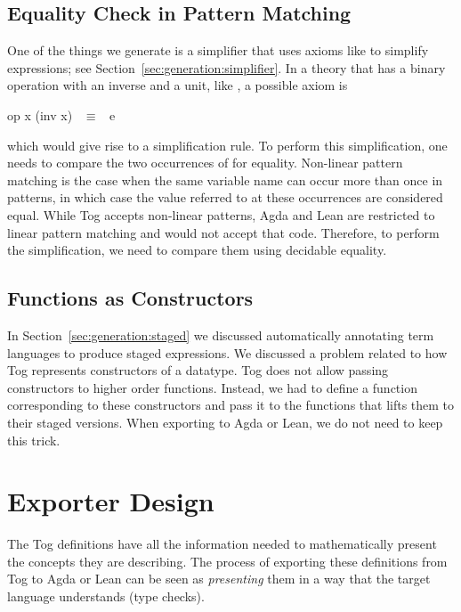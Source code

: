 \subsection{Equality Check in Pattern Matching}
One of the things we generate is a simplifier that uses axioms like  to simplify expressions; see Section~\ref{sec:generation:simplifier}. 
In a theory that has a binary operation with an inverse and a unit, like , a possible axiom is  
\begin{agdacode}
op x (inv x) ~$\equiv$~ e 
\end{agdacode}
\noindent which would give rise to a simplification rule. To perform this simplification, one needs to compare the two occurrences of  for equality. Non-linear pattern matching is the case when the same variable name can occur more than once in patterns, in which case the value referred to at these occurrences are considered equal. While Tog accepts non-linear patterns, Agda and Lean are restricted to linear pattern matching and would not accept that code. Therefore, to perform the simplification, we need to compare them using decidable equality.

\subsection{Functions as Constructors}
In Section~\ref{sec:generation:staged} we discussed automatically annotating term languages to produce staged expressions. We discussed a problem related to how Tog represents constructors of a datatype. Tog does not allow passing constructors to higher order functions. Instead, we had to define a function corresponding to these constructors and pass it to the functions that lifts them to their staged versions. When exporting to Agda or Lean, we do not need to keep this trick.

\section{Exporter Design}
\label{sec:export_design}
The Tog definitions have all the information needed to mathematically present the concepts they are describing. The process of exporting these definitions from Tog to Agda or Lean can be seen as \emph{presenting} them in a way that the target language understands (type checks).

